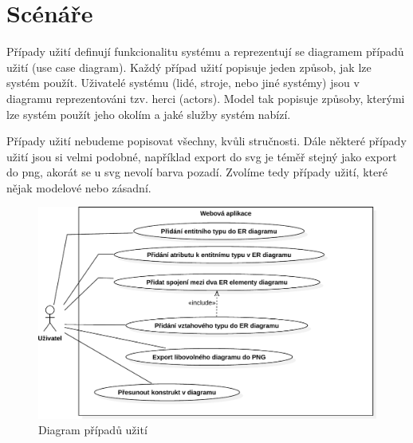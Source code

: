 \section{Scénáře}

Případy užití definují funkcionalitu systému a reprezentují se diagramem případů užití (use case diagram).
Každý případ užití popisuje jeden způsob, jak lze systém použít.
Uživatelé systému (lidé, stroje, nebo jiné systémy) jsou v diagramu reprezentováni tzv. herci (actors).
Model tak popisuje způsoby, kterými lze systém použít jeho okolím a jaké služby systém nabízí.~\cite[s.~65]{overgaard_usecases_2005}

Případy užití nebudeme popisovat všechny, kvůli stručnosti.
Dále některé případy užití jsou si velmi podobné, například export do \acrshort{svg} je téměř stejný jako export do \acrshort{png}, akorát se u \acrshort{svg} nevolí barva pozadí.
Zvolíme tedy případy užití, které nějak modelové nebo zásadní.

\begin{figure}[!htb]
  \centering
  \includegraphics[width=\maxwidth{0.7\textwidth}]{../img/diagrams/use-case-diagram.pdf}
  \caption{Diagram případů užití}
  \label{fig:use-case-diagram}
\end{figure}

\newcommand{\ucsub}[1]{\textbf{#1}}
\newcommand{\uc}[1]{\subsection*{#1}}
\def\ucstart{\ucsub{Počáteční stav}\\\indent}
\def\ucnormal{\ucsub{Běžný průběh}}
\def\ucerrors{\ucsub{Možné chyby}}
\def\ucend{\ucsub{Stav systému po dokončení}\\\indent}

